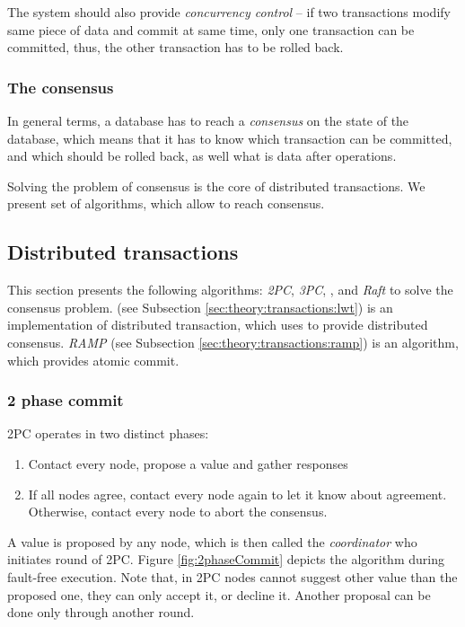 The system should also provide \emph{concurrency control} -- if two transactions modify same piece of data and commit at same time, only one transaction can be committed, 
thus, the other transaction has to be rolled back.


\subsubsection{The consensus}
In general terms, a database has to reach a \emph{consensus} on the state of the database, which means that it has to know which transaction can be committed, and which should be rolled back, as well what is data after operations.

Solving the problem of consensus is the core of distributed transactions. We present set of algorithms, which allow to reach consensus.

\subsection{Distributed transactions}


This section presents the following algorithms: \emph{2PC}, \emph{3PC}, \paxos, and \emph{Raft} to solve the consensus problem. \lwt (see Subsection \ref{sec:theory:transactions:lwt}) is an implementation of distributed transaction, which uses \paxos to provide distributed consensus. \emph{RAMP} (see Subsection \ref{sec:theory:transactions:ramp}) is an algorithm, which provides atomic commit.

\subsubsection{2 phase commit}
2PC \cite{2phaseC}  operates in two distinct phases:
\begin{enumerate}
\item Contact every node, propose a value and gather responses
\item If all nodes agree, contact every node again to let it know about agreement. Otherwise, contact every node to abort the consensus.
\end{enumerate}

A value is proposed by any node, which is then called the \emph{coordinator} who initiates round of 2PC.
Figure \ref{fig:2phaseCommit} depicts the algorithm during fault-free execution. Note that, in 2PC nodes cannot suggest other value than the proposed one, they can only accept it, or decline it. Another proposal can be done only through another round.

